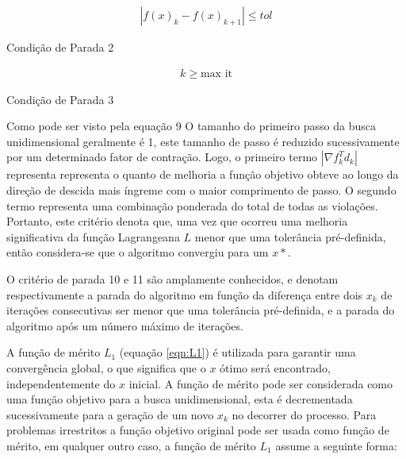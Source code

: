 \documentclass{article}
\begin{document}
\begin{eqfloat}[H]
\begin{equation}
\begin{split}
|f(x)_k - f(x)_{k+1}| \leq tol
\end{split}
\end{equation}
\caption{Condição de Parada 2}
\label{eqn:cp2}
\end{eqfloat}

\begin{eqfloat}[H]
\begin{equation}
\begin{split}
k \geq \text{max it}
\end{split}
\end{equation}
\caption{Condição de Parada 3}
\label{eqn:cp3}
\end{eqfloat}

Como pode ser visto pela equação 9 O tamanho do primeiro passo da busca unidimensional geralmente é 1, este tamanho de passo é reduzido sucessivamente por um determinado fator de contração. Logo, o primeiro termo $| \nabla f_k^T d_k|$ representa  representa o quanto de melhoria a função objetivo obteve ao longo da direção de descida mais íngreme com o maior comprimento de passo.
O segundo termo representa uma combinação ponderada do total de todas as violações. Portanto, este critério
denota que, uma vez que ocorreu uma melhoria significativa da função Lagrangeana $L$ menor que uma tolerância pré-definida, então considera-se que o algoritmo convergiu para um $x*$.\newline

O critério de parada 10 e 11 são amplamente conhecidos, e denotam respectivamente a parada do algoritmo em função da diferença entre dois $x_k$ de iterações consecutivas ser menor que uma tolerância pré-definida, e a parada do algoritmo após um número máximo de iterações.\newline




A função de mérito $L_1$ (equação \ref{eqn:L1}) é utilizada para garantir uma convergência global, o que significa que o $x$ ótimo será encontrado, independentemente do $x$ inicial. A função de mérito pode ser considerada como uma função objetivo para a busca unidimensional, esta é decrementada sucessivamente para a geração de um novo $x_k$ no decorrer do processo. Para problemas irrestritos a função objetivo original pode ser usada como função de mérito, em qualquer outro caso, a função de mérito $L_1$ assume a seguinte forma:
\end{document}
